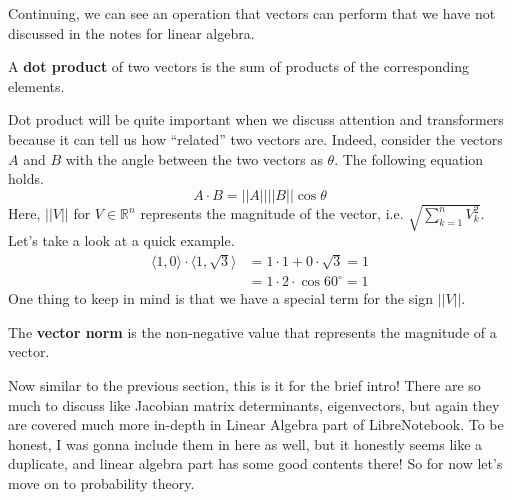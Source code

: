 \documentclass[../../../main.tex]{subfiles}
\begin{document}
Continuing, we can see an operation that vectors can perform that
we have not discussed in the notes for linear algebra.

\begin{definition}{}{}
A \textbf{dot product} of two vectors is the sum of products of the
corresponding elements.
\end{definition}

Dot product will be quite important when we discuss attention and
transformers because it can tell us how ``related'' two vectors are.
Indeed, consider the vectors $A$ and $B$ with the angle between the
two vectors as $\theta$. The following equation holds.
\[
A \cdot B = ||A|| ||B|| \cos\theta
\]
Here, $||V||$ for $V \in \mathbb{R}^n$ represents the magnitude of the
vector, i.e. $\sqrt{\sum_{k=1}^n V_k^2}$. Let's take a look at a quick
example.
\begin{align*}
    \langle 1, 0 \rangle \cdot \langle 1, \sqrt{3} \rangle
    &= 1 \cdot 1 + 0 \cdot \sqrt{3} = 1 \\
    &= 1 \cdot 2 \cdot \cos60^\circ = 1
\end{align*}
One thing to keep in mind is that we have a special term for the
sign $||V||$.

\begin{definition}{}{}
The \textbf{vector norm} is the non-negative value that represents
the magnitude of a vector.
\end{definition}

Now similar to the previous section, this is it for the brief intro!
There are so much to discuss like Jacobian matrix determinants,
eigenvectors, but again they are covered much more in-depth in
Linear Algebra part of LibreNotebook. To be honest, I was gonna
include them in here as well, but it honestly seems like a duplicate,
and linear algebra part has some good contents there! So for now
let's move on to probability theory.
\end{document}
